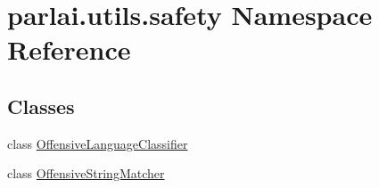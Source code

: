 \hypertarget{namespaceparlai_1_1utils_1_1safety}{}\section{parlai.\+utils.\+safety Namespace Reference}
\label{namespaceparlai_1_1utils_1_1safety}
\subsection*{Classes}
\begin{DoxyCompactItemize}
\item 
class \hyperlink{classparlai_1_1utils_1_1safety_1_1OffensiveLanguageClassifier}{Offensive\+Language\+Classifier}
\item 
class \hyperlink{classparlai_1_1utils_1_1safety_1_1OffensiveStringMatcher}{Offensive\+String\+Matcher}
\end{DoxyCompactItemize}
